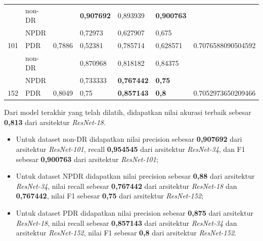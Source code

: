 \begin{table}[H]
\begin{center}
\begin{tabular}{|c|l|c|l|l|l|c|}
			& non-DR                                             &                          & \textbf{0,907692} & 0,893939 & \textbf{0,900763} &                    \\ \cline{2-2} \cline{4-6}
			& NPDR                                               &                          & 0,72973  & 0,627907 & 0,675    &                                      \\ \cline{2-2} \cline{4-6}
			\multirow{-3}{*}{101} & PDR                                                & \multirow{-3}{*}{0,7886} & 0,52381  & 0,785714 & 0,628571 & \multirow{-3}{*}{0.7076588090504592} \\ \hline
			& non-DR                                             &                          & 0,870968 & 0,818182 & 0,84375  &                                      \\ \cline{2-2} \cline{4-6}
			& NPDR                                               &                          & 0,733333 & \textbf{0,767442} & \textbf{0,75}     &                    \\ \cline{2-2} \cline{4-6}
			\multirow{-3}{*}{152} & PDR                                                & \multirow{-3}{*}{0,8049} & 0,75     & \textbf{0,857143} & \textbf{0,8}      & \multirow{-3}{*}{0.7052973650209466} \\ \hline
		\end{tabular}
	\end{center}
\end{table}

Dari model terakhir yang telah dilatih, didapatkan nilai akurasi terbaik sebesar \textbf{0,813} dari arsitektur \emph{ResNet-18}.

\begin{itemize}
	
	\item Untuk dataset non-DR didapatkan nilai precision sebesar \textbf{0,907692} dari arsitektur \emph{ResNet-101}, recall \textbf{0,954545} dari arsitektur \emph{ResNet-34}, dan F1 sebesar \textbf{0,900763} dari arsitektur \emph{ResNet-101};
	
	\item Untuk dataset NPDR didapatkan nilai precision sebesar \textbf{0,88} dari arsitektur \emph{ResNet-34}, nilai recall sebesar \textbf{0,767442} dari arsitektur \emph{ResNet-18} dan \textbf{0,767442}, nilai F1 sebesar \textbf{0,75} dari arsitektur \emph{ResNet-152};
	
	\item Untuk dataset PDR didapatkan nilai precision sebesar \textbf{0,875} dari arsitektur \emph{ResNet-18}, nilai recall sebesar \textbf{0,857143} dari arsitektur \emph{ResNet-34} dan arsitektur \emph{ResNet-152}, nilai F1 sebesar \textbf{0,8} dari arsitektur \emph{ResNet-152}.
	
\end{itemize}

